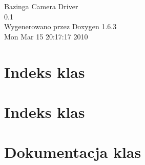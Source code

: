 \documentclass[a4paper]{book}
\begin{document}
\hypersetup{pageanchor=false}
\begin{titlepage}
\vspace*{7cm}
\begin{center}
{\Large Bazinga Camera Driver \\[1ex]\large 0.1 }\\
\vspace*{1cm}
{\large Wygenerowano przez Doxygen 1.6.3}\\
\vspace*{0.5cm}
{\small Mon Mar 15 20:17:17 2010}\\
\end{center}
\end{titlepage}
\clearemptydoublepage
{}
\tableofcontents
\clearemptydoublepage
{}
\hypersetup{pageanchor=true}
\chapter{Indeks klas}

\chapter{Indeks klas}

\chapter{Dokumentacja klas}








\printindex
\end{document}
